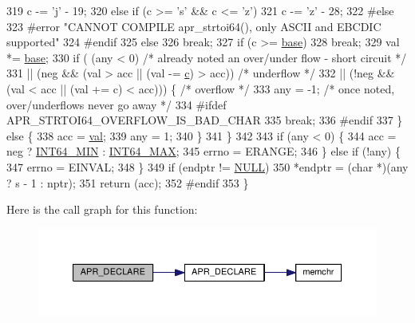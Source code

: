 \begin{DoxyCode}
319         c -= \textcolor{charliteral}{'j'} - 19;
320     \textcolor{keywordflow}{else} \textcolor{keywordflow}{if} (c >= \textcolor{charliteral}{'s'} && c <= \textcolor{charliteral}{'z'})
321         c -= \textcolor{charliteral}{'z'} - 28;
322 \textcolor{preprocessor}{#else}
323 \textcolor{preprocessor}{#error "CANNOT COMPILE apr\_strtoi64(), only ASCII and EBCDIC supported" }
324 \textcolor{preprocessor}{#endif}
325     \textcolor{keywordflow}{else}
326         \textcolor{keywordflow}{break};
327     \textcolor{keywordflow}{if} (c >= \hyperlink{group__APACHE__CORE__CONFIG_ga4f273a965cc36c5abc3b82c390914c29}{base})
328         \textcolor{keywordflow}{break};
329     val *= \hyperlink{group__APACHE__CORE__CONFIG_ga4f273a965cc36c5abc3b82c390914c29}{base};
330         \textcolor{keywordflow}{if} ( (any < 0)  \textcolor{comment}{/* already noted an over/under flow - short circuit */}
331            || (neg && (val > acc || (val -= \hyperlink{group__APACHE__CORE__HTTPD_ga7cce37ef8558e46f408cb4d0f555605b}{c}) > acc)) \textcolor{comment}{/* underflow */}
332            || (!neg && (val < acc || (val += c) < acc))) \{       \textcolor{comment}{/* overflow */}
333             any = -1;   \textcolor{comment}{/* once noted, over/underflows never go away */}
334 \textcolor{preprocessor}{#ifdef APR\_STRTOI64\_OVERFLOW\_IS\_BAD\_CHAR}
335             \textcolor{keywordflow}{break};
336 \textcolor{preprocessor}{#endif}
337         \} \textcolor{keywordflow}{else} \{
338             acc = \hyperlink{group__APACHE__CORE__CONFIG_gae553dcb033cb5c1e269683855e4f676a}{val};
339         any = 1;
340         \}
341     \}
342 
343     \textcolor{keywordflow}{if} (any < 0) \{
344     acc = neg ? \hyperlink{apr__strings_8c_ab21f12f372f67b8ff0aa3432336ede67}{INT64\_MIN} : \hyperlink{apr__strings_8c_ad0d744f05898e32d01f73f8af3cd2071}{INT64\_MAX};
345     errno = ERANGE;
346     \} \textcolor{keywordflow}{else} \textcolor{keywordflow}{if} (!any) \{
347     errno = EINVAL;
348     \}
349     \textcolor{keywordflow}{if} (endptr != \hyperlink{pcre_8txt_ad7f989d16aa8ca809a36bc392c07fba1}{NULL})
350     *endptr = (\textcolor{keywordtype}{char} *)(any ? s - 1 : nptr);
351     \textcolor{keywordflow}{return} (acc);
352 \textcolor{preprocessor}{#endif}
353 \}
\end{DoxyCode}


Here is the call graph for this function\+:
\nopagebreak
\begin{figure}[H]
\begin{center}
\leavevmode
\includegraphics[width=350pt]{group__apr__time_ga0151b93f22f81f7b1af9bc4dfcd11f86_cgraph}
\end{center}
\end{figure}


